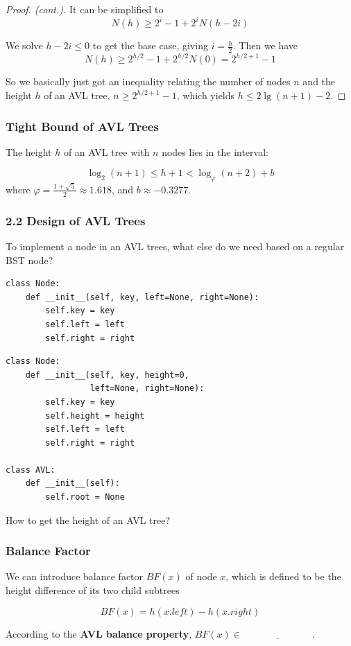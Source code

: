\documentclass[aspectratio=169, 14pt]{beamer}
\begin{document}
\begin{frame}
\begin{proof}[Proof. (cont.)]
It can be simplified to
\[N(h) \geq 2^{i} - 1 + 2^iN(h-2i)\]

We solve $h-2i \leq 0$ to get the base case, giving $i = \frac{h}{2}$. Then we have
\[N(h) \geq 2^{h/2} - 1 + 2^{h/2}N(0) = 2^{h/2 + 1} - 1\] 

So we basically just got an inequality relating the number of nodes $n$ and the height $h$ of an AVL tree, $n\geq 2^{h/2 + 1} - 1$, which yields $h \leq 2\lg{(n + 1)} - 2$.
\end{proof}
    

\end{frame}

\begin{frame}
    \frametitle{Tight Bound of AVL Trees}
    The height $h$ of an AVL tree with $n$ nodes lies in the interval:

    \[ \log_{2}(n + 1) \leq h + 1 < \log_{\varphi}(n + 2) + b \]
where $\varphi = \frac{1 + \sqrt{5}}{2} \approx 1.618$, and $b \approx -0.3277$.
\end{frame}

\begin{frame}[fragile]
    \frametitle{2.2 Design of AVL Trees}
    
 To implement a node in an AVL trees, what else do we need based on a regular BST node?
    \begin{verbatim}
class Node:
    def __init__(self, key, left=None, right=None):
        self.key = key
        self.left = left
        self.right = right
    \end{verbatim}
\end{frame}

\begin{frame}[fragile]

\begin{verbatim}
class Node:
    def __init__(self, key, height=0, 
                 left=None, right=None):
        self.key = key
        self.height = height
        self.left = left
        self.right = right

class AVL:
    def __init__(self):
        self.root = None
\end{verbatim}
 How to get the height of an AVL tree?
\end{frame}

\begin{frame}
    \frametitle{Balance Factor}
We can introduce \alert{balance factor} $BF(x)$ of node $x$, which is defined to be the height difference of its two child subtrees 

\[BF(x) = h(x.left) - h(x.right)\]

According to the \textbf{AVL balance property}, $BF(x) \in \underline{\hspace{3cm}}$.

\end{frame}
\end{document}
